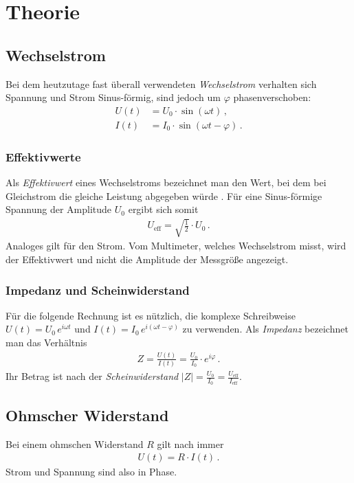 \documentclass[12pt,a4paper,titlepage,headinclude,bibtotoc]{scrartcl}
\begin{document}
\section{Theorie}
\label{sec:theorie}
\subsection{Wechselstrom}
Bei dem heutzutage fast überall verwendeten \textit{Wechselstrom} verhalten sich Spannung und Strom Sinus-förmig, sind jedoch um $\varphi$ phasenverschoben:
\begin{align}
	U(t)&=U_0\cdot\sin(\omega t)\,,\\
	I(t)&=I_0\cdot\sin(\omega t-\varphi)\,.
\end{align}

\subsubsection{Effektivwerte}
Als \textit{Effektivwert} eines Wechselstroms  bezeichnet man den Wert, bei dem bei Gleichstrom die gleiche Leistung abgegeben würde \cite[S.1131 f.]{tipler}.
Für eine Sinus-förmige Spannung der Amplitude $U_0$ ergibt sich somit
\begin{align}
	U_\text{eff}=\sqrt{\frac{1}{2}}\cdot U_0 \,.
\end{align}
Analoges gilt für den Strom.
Vom Multimeter, welches Wechselstrom misst, wird der Effektivwert und nicht die Amplitude der Messgröße angezeigt.

\subsubsection{Impedanz und Scheinwiderstand}
Für die folgende Rechnung ist es nützlich, die komplexe Schreibweise $U(t)=U_0 \, e^{i\omega t}$ und $I(t)=I_0 \, e^{i(\omega t - \varphi)}$ zu verwenden.
Als \textit{Impedanz} bezeichnet man das Verhältnis
\begin{align}
	Z=\frac{U(t)}{I(t)}=\frac{U_0}{I_0}\cdot e^{i\varphi}\,.
\end{align}
Ihr Betrag ist nach \cite[S.463]{taschenbuchPhysik} der \textit{Scheinwiderstand} $|Z|=\frac{U_0}{I_0}=\frac{U_\text{eff}}{I_\text{eff}}$.

\subsection{Ohmscher Widerstand}
Bei einem ohmschen Widerstand $R$ gilt nach \cite[S. 1131]{tipler} immer
\begin{align}
	U(t)=R \cdot I(t)\,.
\end{align}
Strom und Spannung sind also in Phase.
\end{document}
